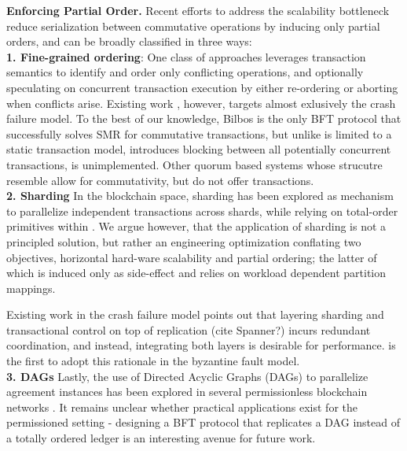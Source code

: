 \par \textbf{Enforcing Partial Order.}
Recent efforts to address the scalability bottleneck reduce serialization between commutative operations by inducing only partial orders, and can be broadly classified in three ways:\\
\textbf{1. Fine-grained ordering}: One class of approaches leverages transaction semantics to identify and order only conflicting operations, and optionally speculating on concurrent transaction execution by either re-ordering or aborting when conflicts arise. Existing work \cite{moraru2013there, lamport2005generalized, sutra2011fast, li2012redblue, park2019exploiting, yan2018carousel, mu2016consolidating, mu2014extracting, zhang2015tapir, kraska2013mdcc}, however, targets almost exlusively the crash failure model. To the best of our knowledge, Bilbos \cite{bazzi2018clairvoyant} is the only BFT protocol that successfully solves SMR for commutative transactions, but unlike \sys is limited to a static transaction model, introduces blocking between all potentially concurrent transactions, is unimplemented. Other quorum based systems whose strucutre resemble \sys \cite{malkhi1998byzantine, abd2005fault, cowling2006hq, liskov2006tolerating} allow for commutativity, but do not offer transactions. \\
\textbf{2. Sharding} In the blockchain space, sharding has been explored as mechanism to parallelize independent transactions across shards, while relying on total-order primitives within \cite{zamani2018rapidchain, al2017chainspace, kokoris2018omniledger}. We argue however, that the application of sharding is not a principled solution, but rather an engineering optimization conflating two objectives, horizontal hard-ware scalability and partial ordering; the latter of which is induced only as side-effect and relies on workload dependent partition mappings. 

Existing work in the crash failure model \cite{zhang2016operation, zhang2015tapir, mu2016consolidating } points out that layering sharding and transactional control on top of replication (cite Spanner?) incurs redundant coordination, and instead, integrating both layers is desirable for performance. \sys is the first to adopt this rationale in the byzantine fault model.\\
\textbf{3. DAGs} Lastly, the use of Directed Acyclic Graphs (DAGs) to parallelize agreement instances has been explored in several permissionless blockchain networks \cite{pervez2018comparative, popov2016tangle, rocket2018snowflake}. It remains unclear whether practical applications exist for the permissioned setting - designing a BFT protocol that replicates a DAG instead of a totally ordered ledger is an interesting avenue for future work.

